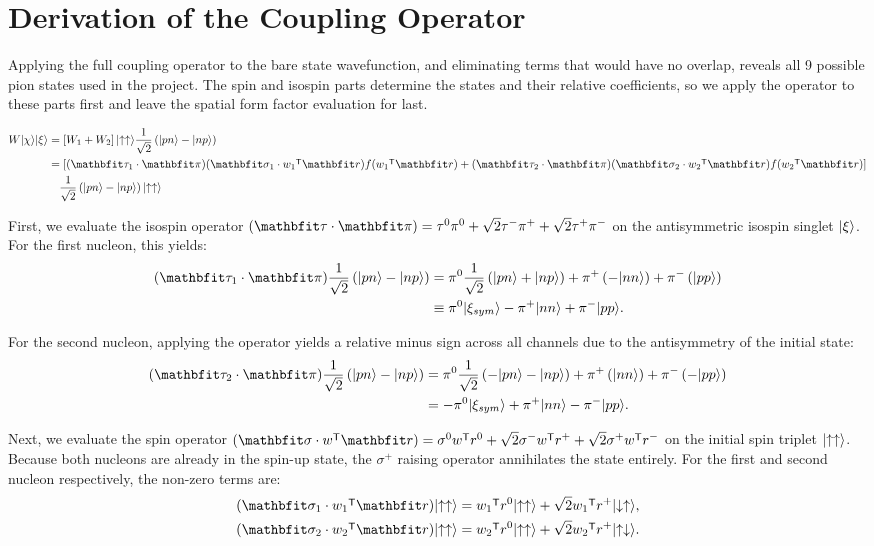 \documentclass[a4paper,oneside,article,12pt]{memoir}
\begin{document}
\appendix
\chapter{Derivation of the Coupling Operator} \label{app:W}
Applying the full coupling operator to the bare state wavefunction, and eliminating terms that would have no overlap, reveals all 9 possible pion states used in the project. 
The spin and isospin parts determine the states and their relative coefficients, so we apply the operator to these parts first and leave the spatial form factor evaluation for last. 

\begin{align}
    W \ket{\chi} \ket{\xi} &= \br[2]{W_1+W_2} \ket{\uparrow\uparrow} \frac{1}{\sqrt{2}}\br{\ket{pn}-\ket{np}} \n
    &= \br[2]{(\v{\tau}_1 \cdot \v{\pi})(\v{\sigma}_1 \cdot w_1\tr \v{r})f(w_1\tr \v{r}) + (\v{\tau}_2 \cdot \v{\pi})(\v{\sigma}_2 \cdot w_2\tr \v{r})f(w_2\tr \v{r})} \n & \quad \frac{1}{\sqrt{2}}\br{\ket{pn}-\ket{np}} \ket{\uparrow\uparrow}
\end{align}

First, we evaluate the isospin operator $\br{\v{\tau} \cdot \v{\pi}} = \tau^0\pi^0 + \sqrt{2}\tau^-\pi^+ + \sqrt{2}\tau^+\pi^-$ on the antisymmetric isospin singlet $\lvert\xi\rangle$. 
For the first nucleon, this yields:
\begin{align}
    (\v{\tau}_1 \cdot \v{\pi}) \frac{1}{\sqrt{2}}\br{\ket{pn}-\ket{np}} 
    &= \pi^0 \frac{1}{\sqrt{2}}\br{\ket{pn}+\ket{np}} + \pi^+ \br{-\ket{nn}} + \pi^- \br{\ket{pp}} \n
    &\equiv \pi^0 \ket{\xi_{sym}} - \pi^+ \ket{nn} + \pi^- \ket{pp}.
\end{align}

For the second nucleon, applying the operator yields a relative minus sign across all channels due to the antisymmetry of the initial state:
\begin{align}
    (\v{\tau}_2 \cdot \v{\pi}) \frac{1}{\sqrt{2}}\br{\ket{pn}-\ket{np}} 
    &= \pi^0 \frac{1}{\sqrt{2}}\br{-\ket{pn}-\ket{np}} + \pi^+ \br{\ket{nn}} + \pi^- \br{-\ket{pp}} \n
    &= -\pi^0 \ket{\xi_{sym}} + \pi^+ \ket{nn} - \pi^- \ket{pp}.
\end{align}

Next, we evaluate the spin operator $\br{\v{\sigma} \cdot w\tr\v{r}} = \sigma^0 w\tr r^0 + \sqrt{2}\sigma^- w\tr r^+ + \sqrt{2}\sigma^+ w\tr r^-$ on the initial spin triplet $\lvert\uparrow\uparrow\rangle$. 
Because both nucleons are already in the spin-up state, the $\sigma^+$ raising operator annihilates the state entirely. For the first and second nucleon respectively, the non-zero terms are:
\begin{align}
    (\v{\sigma}_1 \cdot w_1\tr \v{r}) \ket{\uparrow\uparrow} &= w_1\tr r^0 \ket{\uparrow\uparrow} + \sqrt{2}w_1\tr r^+ \ket{\downarrow\uparrow}, \\
    (\v{\sigma}_2 \cdot w_2\tr \v{r}) \ket{\uparrow\uparrow} &= w_2\tr r^0 \ket{\uparrow\uparrow} + \sqrt{2}w_2\tr r^+ \ket{\uparrow\downarrow}.
\end{align}
\end{document}
